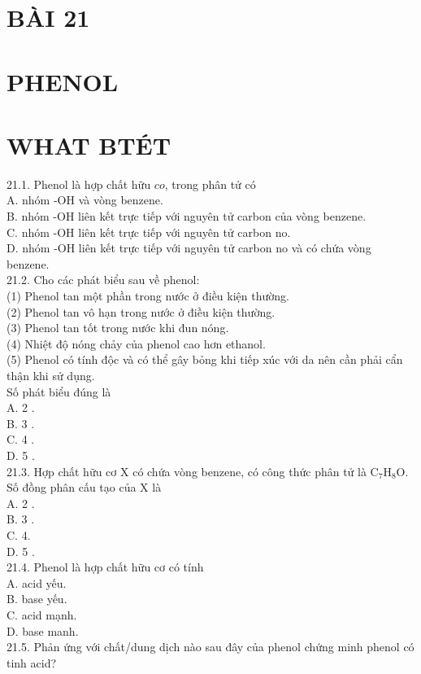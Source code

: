 \documentclass[10pt]{article}
\begin{document}
\section*{BÀI 21}
\section*{PHENOL}
\section*{WHAT BTÉT}
21.1. Phenol là hợp chất hữu $c o$, trong phân tử có\\
A. nhóm -OH và vòng benzene.\\
B. nhóm -OH liên kết trực tiếp với nguyên tử carbon của vòng benzene.\\
C. nhóm -OH liên kết trực tiếp với nguyên tử carbon no.\\
D. nhóm -OH liên kết trực tiếp với nguyên tử carbon no và có chứa vòng benzene.\\
21.2. Cho các phát biểu sau về phenol:\\
(1) Phenol tan một phần trong nước ở điều kiện thường.\\
(2) Phenol tan vô hạn trong nước ở điều kiện thường.\\
(3) Phenol tan tốt trong nước khi đun nóng.\\
(4) Nhiệt độ nóng chảy của phenol cao hơn ethanol.\\
(5) Phenol có tính độc và có thể gây bỏng khi tiếp xúc với da nên cần phải cẩn thận khi sử dụng.\\
Số phát biểu đúng là\\
A. 2 .\\
B. 3 .\\
C. 4 .\\
D. 5 .\\
21.3. Hợp chất hữu cơ X có chứa vòng benzene, có công thức phân tử là $\mathrm{C}_{7} \mathrm{H}_{8} \mathrm{O}$. Số đồng phân cấu tạo của X là\\
A. 2 .\\
B. 3 .\\
C. 4.\\
D. 5 .\\
21.4. Phenol là hợp chất hữu cơ có tính\\
A. acid yếu.\\
B. base yếu.\\
C. acid mạnh.\\
D. base manh.\\
21.5. Phản ứng với chất/dung dịch nào sau đây của phenol chứng minh phenol có tinh acid?\\
\end{document}

